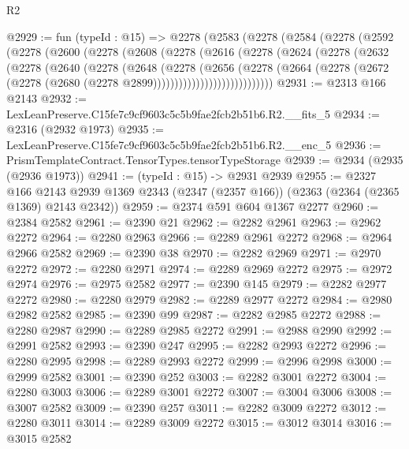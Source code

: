 \begin{lexlean}{R2}
\begin{coremodule}
@2929 := fun (typeId : @15) =>
  @2278
    (@2583
      (@2278
        (@2584
          (@2278
            (@2592
              (@2278
                (@2600
                  (@2278
                    (@2608
                      (@2278
                        (@2616
                          (@2278
                            (@2624
                              (@2278
                                (@2632
                                  (@2278
                                    (@2640
                                      (@2278
                                        (@2648
                                          (@2278
                                            (@2656
                                              (@2278
                                                (@2664
                                                  (@2278
                                                    (@2672
                                                      (@2278
                                                        (@2680
                                                          (@2278 @2899))))))))))))))))))))))))))))
@2931 := @2313 @166 @2143
@2932 := LexLeanPreserve.C15fe7c9cf9603c5c5b9fae2fcb2b51b6.R2.__fits_5
@2934 := @2316 (@2932 @1973)
@2935 := LexLeanPreserve.C15fe7c9cf9603c5c5b9fae2fcb2b51b6.R2.__enc_5
@2936 := PrismTemplateContract.TensorTypes.tensorTypeStorage
@2939 := @2934 (@2935 (@2936 @1973))
@2941 := (typeId : @15) -> @2931 @2939
@2955 := @2327
    @166
    @2143
    @2939
    @1369
    @2343
    (@2347 (@2357 @166))
    (@2363 (@2364 (@2365 @1369) @2143 @2342))
@2959 := @2374 @591 @604 @1367 @2277
@2960 := @2384 @2582
@2961 := @2390 @21
@2962 := @2282 @2961
@2963 := @2962 @2272
@2964 := @2280 @2963
@2966 := @2289 @2961 @2272
@2968 := @2964 @2966 @2582
@2969 := @2390 @38
@2970 := @2282 @2969
@2971 := @2970 @2272
@2972 := @2280 @2971
@2974 := @2289 @2969 @2272
@2975 := @2972 @2974
@2976 := @2975 @2582
@2977 := @2390 @145
@2979 := @2282 @2977 @2272
@2980 := @2280 @2979
@2982 := @2289 @2977 @2272
@2984 := @2980 @2982 @2582
@2985 := @2390 @99
@2987 := @2282 @2985 @2272
@2988 := @2280 @2987
@2990 := @2289 @2985 @2272
@2991 := @2988 @2990
@2992 := @2991 @2582
@2993 := @2390 @247
@2995 := @2282 @2993 @2272
@2996 := @2280 @2995
@2998 := @2289 @2993 @2272
@2999 := @2996 @2998
@3000 := @2999 @2582
@3001 := @2390 @252
@3003 := @2282 @3001 @2272
@3004 := @2280 @3003
@3006 := @2289 @3001 @2272
@3007 := @3004 @3006
@3008 := @3007 @2582
@3009 := @2390 @257
@3011 := @2282 @3009 @2272
@3012 := @2280 @3011
@3014 := @2289 @3009 @2272
@3015 := @3012 @3014
@3016 := @3015 @2582

\end{coremodule}
\end{lexlean}
